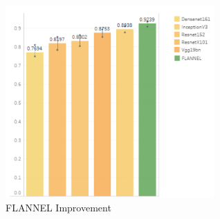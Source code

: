 \documentclass{sigkddExp}
\begin{document}
\begin{figure}[h]
    \includegraphics[width=8cm]{../doc/images/F1Score_vs_rest.png}
    \caption{FLANNEL Improvement}
    \label{fig:f1score}
\end{figure}


\newpage
%

\end{document}
